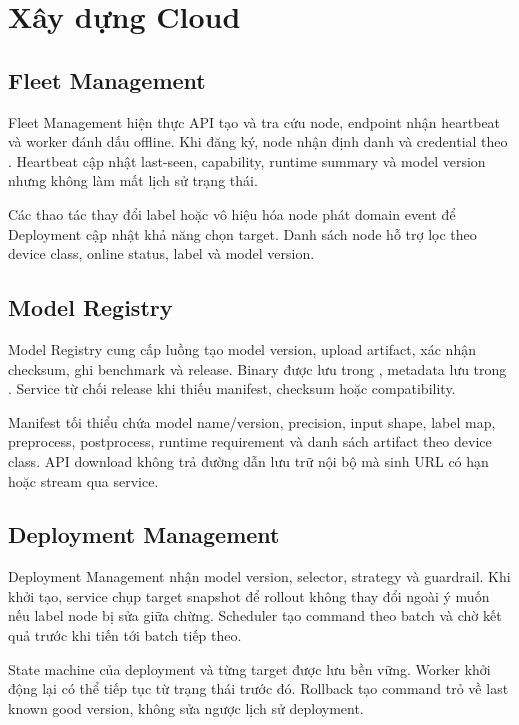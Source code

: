 \section{Xây dựng Cloud}

\subsection{Fleet Management}

Fleet Management hiện thực API tạo và tra cứu node, endpoint nhận heartbeat và
worker đánh dấu offline. Khi đăng ký, node nhận định danh và credential theo
. Heartbeat cập nhật last-seen, capability, runtime summary
và model version nhưng không làm mất lịch sử trạng thái.

Các thao tác thay đổi label hoặc vô hiệu hóa node phát domain event để
Deployment cập nhật khả năng chọn target. Danh sách node hỗ trợ lọc theo device
class, online status, label và model version.

\subsection{Model Registry}

Model Registry cung cấp luồng tạo model version, upload artifact, xác nhận
checksum, ghi benchmark và release. Binary được lưu trong ,
metadata lưu trong . Service từ chối release khi thiếu manifest,
checksum hoặc compatibility.

Manifest tối thiểu chứa model name/version, precision, input shape, label map,
preprocess, postprocess, runtime requirement và danh sách artifact theo device
class. API download không trả đường dẫn lưu trữ nội bộ mà sinh URL có hạn hoặc
stream qua service.

\subsection{Deployment Management}

Deployment Management nhận model version, selector, strategy và guardrail. Khi
khởi tạo, service chụp target snapshot để rollout không thay đổi ngoài ý muốn nếu
label node bị sửa giữa chừng. Scheduler tạo command theo batch và chờ kết quả
trước khi tiến tới batch tiếp theo.

State machine của deployment và từng target được lưu bền vững. Worker khởi động
lại có thể tiếp tục từ trạng thái trước đó. Rollback tạo command trỏ về last known
good version, không sửa ngược lịch sử deployment.

